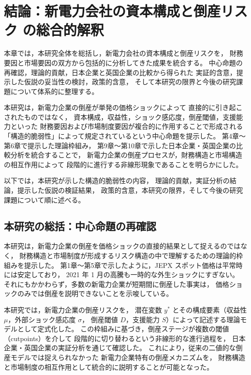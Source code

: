 
\chapter{結論：新電力会社の資本構成と倒産リスク  
の総合的解釈}
\label{chap:conclusion}

本章では，本研究全体を総括し，新電力会社の資本構成と倒産リスクを，
財務要因と市場要因の双方から包括的に分析してきた成果を統合する。
中心命題の再確認，理論的貢献，日本企業と英国企業の比較から得られた
実証的含意，提示した仮説の妥当性の検討，政策的含意，
そして本研究の限界と今後の研究課題について体系的に整理する。

本研究は，新電力企業の倒産が単発の価格ショックによって
直接的に引き起こされたものではなく，
資本構成，収益性，ショック感応度，倒産閾値，支援能力といった
財務要因および市場制度要因が複合的に作用することで形成される
「構造的脆弱性」によって規定されているという中心命題を提示した。
第4章〜第6章で提示した理論枠組み，
第9章〜第10章で示した日本企業・英国企業の比較分析を統合することで，
新電力企業の倒産プロセスが，財務構造と市場構造の相互作用によって
段階的に進行する非線形現象であることを明らかにした。

以下では，本研究が示した構造的脆弱性の内容，
理論的貢献，実証分析の結論，提示した仮説の検証結果，
政策的含意，本研究の限界，そして今後の研究課題について順に述べる。


\section{本研究の総括：中心命題の再確認}

本研究は，新電力企業の倒産を価格ショックの直接的結果として捉えるのではなく，
財務構造と市場制度が形成するリスク構造の中で理解するための理論的枠組みを提示した。
第1章〜第5章で示したように，JEPX スポット価格は平常時には安定しており，
2021 年 1 月の高騰も一時的な外生ショックにすぎない。
それにもかかわらず，多数の新電力企業が短期間に倒産した事実は，
価格ショックのみでは倒産を説明できないことを示唆している。

本研究では，新電力企業の倒産リスクを，
潜在変数 $y^*$ とその構成要素（収益性 $\mu$，外部ショック感応度 $\sigma$，
倒産閾値 $D$，支援能力 $S$）によって記述する理論モデルとして定式化した。
この枠組みに基づき，倒産ステージが複数の閾値（cutpoints）を介して
段階的に切り替わるという非線形的な進行過程を，
日本企業・英国企業の実証分析を通じて確認した。
これにより，従来の二値的な倒産モデルでは捉えられなかった
新電力企業特有の倒産メカニズムを，
財務構造と市場制度の相互作用として統合的に説明することが可能となった。

